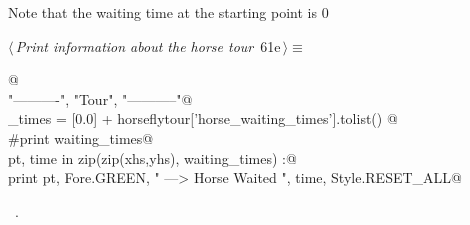 \documentclass[11.5pt]{report}
\begin{document}
\vspace{-0.8cm} \newchunk  Note that the waiting time at the starting point is 0
\begin{flushleft} \small\label{scrap87}\raggedright\small
{} $\langle\,${\itshape Print information about the horse tour}\nobreak\ {\footnotesize {61e}}$\,\rangle\equiv$
\vspace{-1ex}
\begin{list}{}{} \item
\mbox{}\verb@   @\\
\mbox{}\verb@print "\n----------", "\nHorse Tour", "\n-----------"@\\
\mbox{}\verb@waiting_times = [0.0] + horseflytour['horse_waiting_times'].tolist() @\\
\mbox{}\verb@#print waiting_times@\\
\mbox{}\verb@for pt, time in zip(zip(xhs,yhs), waiting_times) :@\\
\mbox{}\verb@   print pt, Fore.GREEN, " ---> Horse Waited ", time, Style.RESET_ALL@\\
\mbox{}\verb@@{\NWsep}
\end{list}
\vspace{-1.5ex}
\footnotesize
\begin{list}{}{\setlength{\itemsep}{-\parsep}\setlength{\itemindent}{-\leftmargin}}
\item \NWtxtMacroRefIn\ .

\item{}
\end{list}
\vspace{4ex}
\end{flushleft}
\end{document}
